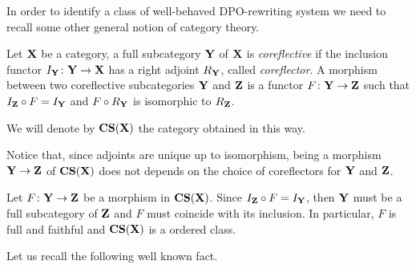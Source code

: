 \documentclass[a4paper,UKenglish,cleveref,pdftex,thm-restate,numberwithinsect]{lipics-v2021}
\newcommand{\cori}{\mathbf{CS}}
\def\X{\textbf {\textup{X}}}
\def\Y{\textbf {\textup{Y}}}
\def\Z{\textbf {\textup{Z}}}
\begin{document}
In order to identify a class of well-behaved DPO-rewriting system we need to recall some other general notion of category theory.

\begin{definition}
	Let $\X$ be a category, a full subcategory $\Y$ of $\X$ is \emph{coreflective} if the inclusion functor $I_\Y\colon \Y\to \X$ has a right adjoint $R_\Y$, called \emph{coreflector}.  A morphism between two coreflective subcategories $\Y$ and $\Z$ is a functor $F\colon \Y \to \Z$ such that $I_\Z \circ F=I_\Y$ and $F\circ R_\Y$ is isomorphic to $R_\Z$.
	
	We will denote by $\cori(\X)$ the category obtained in this way.
\end{definition}

\begin{remark}
	Notice that, since adjoints are unique up to isomorphism, being a morphism $\Y\to \Z$ of $\cori(\X)$ does not depends on the choice of coreflectors for $\Y$ and $\Z$.
\end{remark}

\begin{remark}\label{rem:ff}
	Let $F\colon \Y \to \Z$ be a morphism in $\cori(\X)$. Since $I_\Z\circ F=I_\Y$, then $\Y$ must be a full subcategory of $\Z$ and $F$ must coincide with its inclusion. In particular, $F$ is full and faithful and $\cori(\X)$ is a ordered class.
\end{remark}

\begin{example}\label{ex:1}
\end{example}

\begin{example}\label{ex:2}
\end{example}
\begin{example}
\end{example}


Let us recall the following well known fact.
\end{document}
